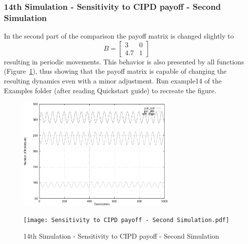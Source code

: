 \subsubsection{14th Simulation - Sensitivity to CIPD payoff - Second Simulation}
In the second part of the comparison the payoff matrix is changed slightly to
\[
B = \begin{bmatrix} 3 & 0 \\ 4.7 & 1 \end{bmatrix}
\] 
resulting in periodic movements. This behavior is also presented by all functions (Figure~\ref{fig:Sensitivity to CIPD payoff - Second Simulation}), thus showing that the payoff matrix is capable of changing the resulting dynamics even with a minor adjustment. Run example14 of the Examples folder (after reading Quickstart guide) to recreate the figure.
	\begin{figure}[h]
	    \centering
		\includegraphics[width=0.7\textwidth]{RefPaperFigures/fig10b.jpeg}\par\vspace{0.5em}
	    \texttt{[image: Sensitivity to CIPD payoff - Second Simulation.pdf]}
	    \caption{14th Simulation - Sensitivity to CIPD payoff - Second Simulation}
	    \label{fig:Sensitivity to CIPD payoff - Second Simulation}
	\end{figure}

